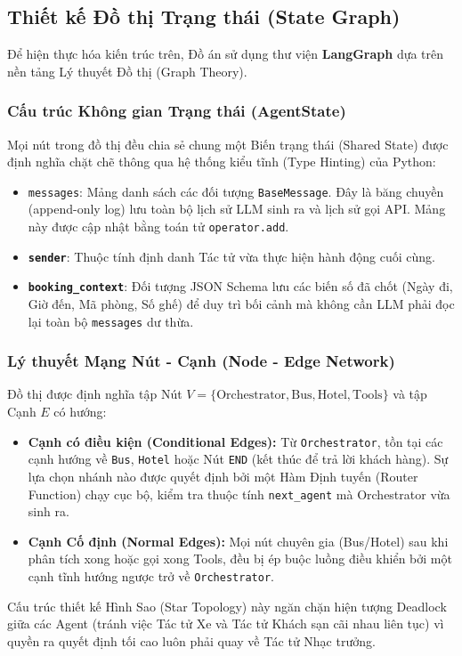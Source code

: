 \subsection{Thiết kế Đồ thị Trạng thái (State Graph)}

Để hiện thực hóa kiến trúc trên, Đồ án sử dụng thư viện \textbf{LangGraph} dựa trên nền tảng Lý thuyết Đồ thị (Graph Theory). 

\subsubsection{Cấu trúc Không gian Trạng thái (AgentState)}
Mọi nút trong đồ thị đều chia sẻ chung một Biến trạng thái (Shared State) được định nghĩa chặt chẽ thông qua hệ thống kiểu tĩnh (Type Hinting) của Python:
\begin{itemize}
    \item \texttt{messages}: Mảng danh sách các đối tượng \texttt{BaseMessage}. Đây là băng chuyền (append-only log) lưu toàn bộ lịch sử LLM sinh ra và lịch sử gọi API. Mảng này được cập nhật bằng toán tử \texttt{operator.add}.
    \item \textbf{\texttt{sender}}: Thuộc tính định danh Tác tử vừa thực hiện hành động cuối cùng.
    \item \textbf{\texttt{booking\_context}}: Đối tượng JSON Schema lưu các biến số đã chốt (Ngày đi, Giờ đến, Mã phòng, Số ghế) để duy trì bối cảnh mà không cần LLM phải đọc lại toàn bộ \texttt{messages} dư thừa.
\end{itemize}

\subsubsection{Lý thuyết Mạng Nút - Cạnh (Node - Edge Network)}
Đồ thị được định nghĩa tập Nút $V = \{\text{Orchestrator}, \text{Bus}, \text{Hotel}, \text{Tools}\}$ và tập Cạnh $E$ có hướng:
\begin{itemize}
    \item \textbf{Cạnh có điều kiện (Conditional Edges):} Từ \texttt{Orchestrator}, tồn tại các cạnh hướng về \texttt{Bus}, \texttt{Hotel} hoặc Nút \texttt{END} (kết thúc để trả lời khách hàng). Sự lựa chọn nhánh nào được quyết định bởi một Hàm Định tuyến (Router Function) chạy cục bộ, kiểm tra thuộc tính \texttt{next\_agent} mà Orchestrator vừa sinh ra.
    \item \textbf{Cạnh Cố định (Normal Edges):} Mọi nút chuyên gia (Bus/Hotel) sau khi phân tích xong hoặc gọi xong Tools, đều bị ép buộc luồng điều khiển bởi một cạnh tĩnh hướng ngược trở về \texttt{Orchestrator}. 
\end{itemize}
Cấu trúc thiết kế Hình Sao (Star Topology) này ngăn chặn hiện tượng Deadlock giữa các Agent (tránh việc Tác tử Xe và Tác tử Khách sạn cãi nhau liên tục) vì quyền ra quyết định tối cao luôn phải quay về Tác tử Nhạc trưởng.
